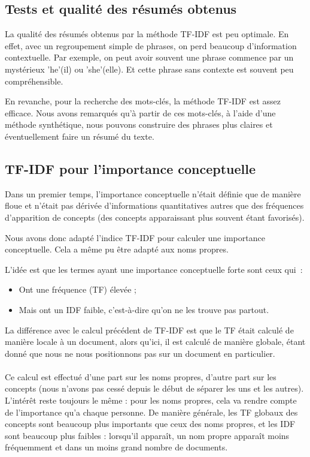 \documentclass[a4paper, 12pt]{article}
\begin{document}
\subsection{Tests et qualité des résumés obtenus}

La qualité des résumés obtenus par la méthode TF-IDF est peu optimale. En effet, avec un regroupement simple de phrases, on perd beaucoup d'information contextuelle. Par exemple, on peut avoir souvent une phrase commence par un mystérieux 'he'(il) ou 'she'(elle). Et cette phrase sans contexte est souvent peu compréhensible.

En revanche, pour la recherche des mots-clés, la méthode TF-IDF est assez efficace. Nous avons remarqués qu'à partir de ces mots-clés, à l'aide d'une méthode synthétique, nous pouvons construire des phrases plus claires et éventuellement faire un résumé du texte.

\subsection{TF-IDF pour l'importance conceptuelle}

Dans un premier temps, l'importance conceptuelle n'était définie que de manière floue et n'était pas dérivée d'informations quantitatives autres que des fréquences d'apparition de concepts (des concepts apparaissant plus souvent étant favorisés).

Nous avons donc adapté l'indice TF-IDF pour calculer une importance conceptuelle. Cela a même pu être adapté aux noms propres.

L'idée est que les termes ayant une importance conceptuelle forte sont ceux qui~:
\begin{itemize}
 \item Ont une fréquence (TF) élevée ;
 \item Mais ont un IDF faible, c'est-à-dire qu'on ne les trouve pas partout.
\end{itemize}


La différence avec le calcul précédent de TF-IDF est que le TF était calculé de manière locale à un document, alors qu'ici, il est calculé de manière globale, étant donné que nous ne nous positionnons pas sur un document en particulier.

\paragraph{}
Ce calcul est effectué d'une part sur les noms propres, d'autre part sur les concepts (nous n'avons pas cessé depuis le début de séparer les uns et les autres). L'intérêt reste toujours le même : pour les noms propres, cela va rendre compte de l'importance qu'a chaque personne. De manière générale, les TF globaux des concepts sont beaucoup plus importants que ceux des noms propres, et les IDF sont beaucoup plus faibles : lorsqu'il apparaît, un nom propre apparaît moins fréquemment et dans un moins grand nombre de documents.
\end{document}
